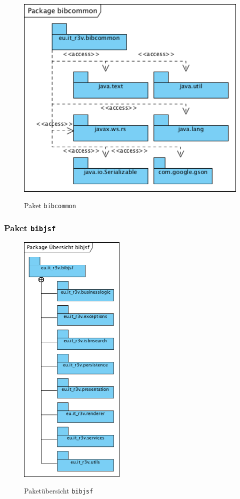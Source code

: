 \documentclass[fontsize=12pt,paper=a4,twoside]{scrartcl}
\begin{document}
\begin{figure} [H] 
\caption{Paket \texttt{bibcommon}} \centering
	\includegraphics[width=1\textwidth]{Diagramme/Packagebibcommon.png} 
	\label{pic:PackageCommon} 
\end{figure}


\subsubsection{Paket \texttt{bibjsf}}
\label{sec:bibclient}

\begin{figure} [H] 
\caption{Paketübersicht \texttt{bibjsf}} \centering
	\includegraphics[width=0.45\textwidth]{Diagramme/Packagebibjsfuebersicht.png} 
	\label{pic:PackagebibjsfUebersicht} 
\end{figure}
\end{document}
